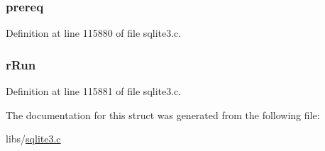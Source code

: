 \subsubsection[{prereq}]{ prereq}\label{struct_where_or_cost_aae7565677c852f3ea5f63a3d5fae63a7}


Definition at line 115880 of file sqlite3.\+c.

\hypertarget{struct_where_or_cost_a19a591aa81312e9d7f3e26df94f10abe}{}
\subsubsection[{r\+Run}]{ r\+Run}\label{struct_where_or_cost_a19a591aa81312e9d7f3e26df94f10abe}


Definition at line 115881 of file sqlite3.\+c.



The documentation for this struct was generated from the following file\+:\begin{DoxyCompactItemize}
\item 
libs/\hyperlink{sqlite3_8c}{sqlite3.\+c}\end{DoxyCompactItemize}
